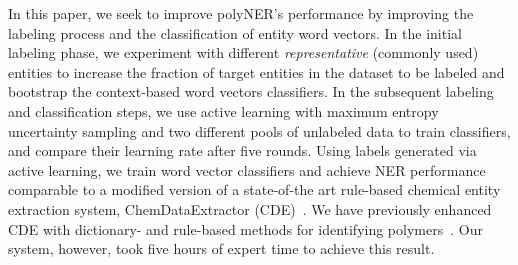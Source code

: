 In this paper, we seek to improve polyNER's performance by improving the labeling process and the classification of entity word vectors. 
In the initial labeling phase, 
we experiment with different \textit{representative} (commonly used) entities to increase the fraction of target entities in the dataset to be labeled and bootstrap the context-based word vectors classifiers. %
In the subsequent labeling and classification steps,
we use active learning with maximum entropy uncertainty sampling and two different pools of unlabeled data to train classifiers, and compare their learning rate after five rounds. 
Using labels generated via active learning, we train word vector classifiers and achieve NER performance comparable to 
a modified version of a state-of-the art rule-based chemical entity extraction
system, ChemDataExtractor (CDE)~\cite{swain2016chemdataextractor}.
We have previously enhanced CDE
with dictionary- and rule-based methods for identifying polymers~\cite{tchoua2017towards}.
Our system, however, took five hours of expert time to achieve this result.

